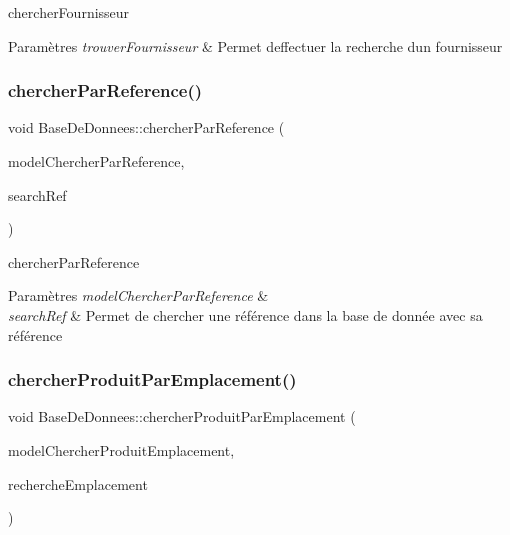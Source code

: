 chercher\+Fournisseur 


\begin{DoxyParams}{Paramètres}
{\em trouver\+Fournisseur} & Permet d\textquotesingle{}effectuer la recherche d\textquotesingle{}un fournisseur \\
\hline
\end{DoxyParams}
\mbox{\label{class_base_de_donnees_aaa4a62ca5864ce24cb0b3d488a609811}} 
\subsubsection{\texorpdfstring{chercher\+Par\+Reference()}{chercherParReference()}}
{\footnotesize\ttfamily void Base\+De\+Donnees\+::chercher\+Par\+Reference (\begin{DoxyParamCaption}\item[{Q\+Sql\+Query\+Model $\ast$}]{model\+Chercher\+Par\+Reference,  }\item[{Q\+String}]{search\+Ref }\end{DoxyParamCaption})}



chercher\+Par\+Reference 


\begin{DoxyParams}{Paramètres}
{\em model\+Chercher\+Par\+Reference} & \\
\hline
{\em search\+Ref} & Permet de chercher une référence dans la base de donnée avec sa référence \\
\hline
\end{DoxyParams}
\mbox{\label{class_base_de_donnees_a7741ad517714e619d7f8a0f202d3b38d}} 
\subsubsection{\texorpdfstring{chercher\+Produit\+Par\+Emplacement()}{chercherProduitParEmplacement()}}
{\footnotesize\ttfamily void Base\+De\+Donnees\+::chercher\+Produit\+Par\+Emplacement (\begin{DoxyParamCaption}\item[{Q\+Sql\+Query\+Model $\ast$}]{model\+Chercher\+Produit\+Emplacement,  }\item[{Q\+String}]{recherche\+Emplacement }\end{DoxyParamCaption})}



